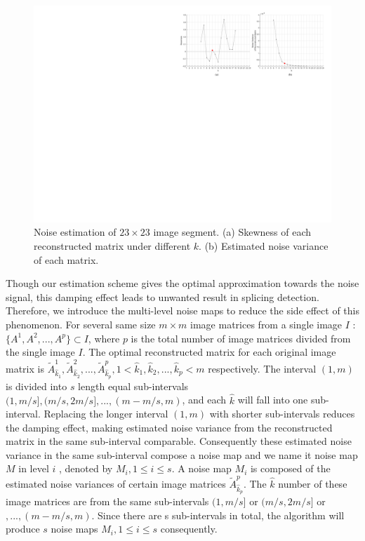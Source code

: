 \documentclass[a4paper, 12pt, twoside]{report}
\begin{document}
\begin{figure}[!htbp]
	\centering
	\includegraphics[width=\textwidth]{svdv3.pdf}
	\caption{Noise estimation of $23\times 23$ image segment. (a) Skewness of each reconstructed matrix under different $k$. (b) Estimated noise variance of each matrix.}
	\label{svd}
\end{figure}

Though our estimation scheme gives the optimal approximation towards the noise signal, this damping effect leads to unwanted result in splicing detection. Therefore, we introduce the multi-level noise maps to reduce the side effect of this phenomenon. For several same size $m\times m$ image matrices from a single image $I$ : $\{{{A}^{1}},{{A}^{2}},...,{{A}^{p}}\}\subset I$, where $p$ is the total number of image matrices divided from the single image $I$. The optimal reconstructed matrix for each original image matrix is $\tilde{A}_{{{{\hat{k}}}_{1}}}^{1},\tilde{A}_{{{{\hat{k}}}_{2}}}^{2},...,\tilde{A}_{{{{\hat{k}}}_{p}}}^{p},1<{{\hat{k}}_{1}},{{\hat{k}}_{2}},...,{{\hat{k}}_{p}}<m$ respectively. The interval $(1,m)$ is divided into $s$ length equal sub-intervals $(1,m/s],(m/s,2m/s],...,(m-m/s,m)$, and each $\hat{k}$ will fall into one sub-interval. Replacing the longer interval $(1,m)$ with shorter sub-intervals reduces the damping effect, making estimated noise variance from the reconstructed matrix in the same sub-interval comparable. Consequently these estimated noise variance in the same sub-interval compose a noise map and we name it noise map $M$ in level $i$ , denoted by ${{M}_{i}},1\le i\le s$. A noise map $M_i$ is composed of the estimated noise variances of certain image matrices $\tilde{A}_{\hat{k}_p}^p$. The $\hat{k}$ number of these image matrices are from the same sub-intervals $(1,m/s]$ or $(m/s,2m/s]$ or $,...,(m-m/s,m)$. Since there are s sub-intervals in total, the algorithm will produce $s$ noise maps $M_i, 1 \le i \le s$ consequently.
\end{document}
